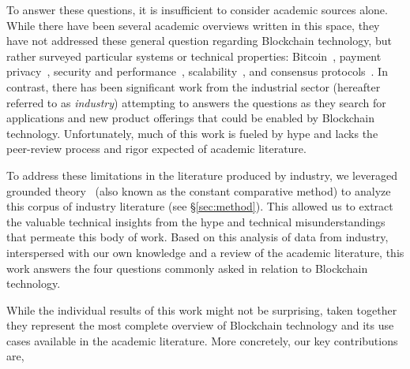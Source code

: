 To answer these questions, it is insufficient to consider academic sources alone.
While there have been several academic overviews written in this space, they have not addressed these general question regarding Blockchain technology, but rather surveyed particular systems or technical properties: Bitcoin~\cite{BMC+15,Narayanan17}, payment privacy~\cite{Conti17}, security and performance~\cite{Gervais16}, scalability~\cite{Croman16}, and consensus protocols~\cite{Bano17,garay2018consensus}.
In contrast, there has been significant work from the industrial sector (hereafter referred to as \emph{industry}) attempting to answers the questions as they search for applications and new product offerings that could be enabled by Blockchain technology.
Unfortunately, much of this work is fueled by hype and lacks the peer-review process and rigor expected of academic literature.

To address these limitations in the literature produced by industry, we leveraged grounded theory~\cite{glaser1965constant,strauss1990basics,corbin1990grounded} (also known as the constant comparative method) to analyze this corpus of industry literature (see \S\ref{sec:method}).
This allowed us to extract the valuable technical insights from the hype and technical misunderstandings that permeate this body of work.
Based on this analysis of data from industry, interspersed with our own knowledge and a review of the academic literature, this work answers the four questions commonly asked in relation to Blockchain technology.

While the individual results of this work might not be surprising, taken together they represent the most complete overview of Blockchain technology and its use cases available in the academic literature.
More concretely, our key contributions are,

